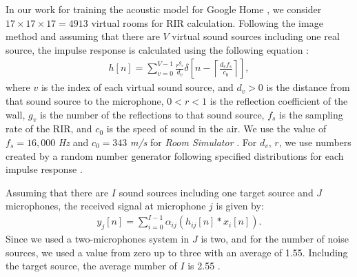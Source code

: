 \documentclass[a4paper]{article}
\begin{document}
In our work for training the acoustic model for Google Home
\cite{C_Kim_INTERSPEECH_2017_1, B_Li_INTERSPEECH_2017_1}, we consider
$17 \times 17 \times 17 = 4913$ virtual rooms for RIR calculation.
Following the image method and assuming that there are $V$ 
virtual sound sources including one real source, 
the impulse response is calculated using the following equation
\cite{ J_Allen_JASA_1979, E_A_Lehmann_ASPAA_2007}:
\begin{align}
    h[n] = \sum_{v = 0}^{V-1} \frac{r^{g_v}}{d_v}
    \delta \left[n -\left \lceil{\frac{d_v f_s}{c_0}}\right \rceil \right],
      \label{eq:h_n_calculation}
\end{align}
where $v$ is the index of each virtual sound source, and $d_v > 0$ is the distance
from that sound source to the microphone, $0 < r < 1$ is
the reflection coefficient of the wall, $g_v$ is
the number of the reflections
to that sound source, $f_s$ is the sampling rate of the RIR, and $c_0$ is the
speed of sound in the air. We use the value of $f_s = 16,000$ \textit{Hz} and
$c_0 = 343$ \textit{m/s} for \textit{Room Simulator} \cite{B_Li_INTERSPEECH_2017_1}.
For $d_v$, $r$, we use numbers created by a random number generator
following specified distributions for each impulse response \cite{C_Kim_INTERSPEECH_2017_1}.

Assuming that there are $I$ sound sources including one target
source and $J$ microphones, the received signal at microphone
$j$ is given by:
\begin{align}
  y_j[n] =  \sum_{i=0}^{I-1} \alpha_{ij} \left(h_{ij}[n] * x_i[n]\right).
  \label{eq:y_j_def}
\end{align}
Since we used a two-microphones system in
\cite{C_Kim_INTERSPEECH_2017_1, B_Li_INTERSPEECH_2017_1}
$J$ is two, and for the number of noise sources, we used a value from zero
up to three with an average of 1.55. Including the target source, the average
number of $I$ is 2.55 \cite{C_Kim_INTERSPEECH_2017_1}.
%
%
%
%
%
%
%
%
%
%
\end{document}
